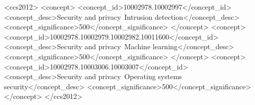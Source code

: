 \begin{CCSXML}
<ccs2012>
   <concept>
       <concept_id>10002978.10002997</concept_id>
       <concept_desc>Security and privacy~Intrusion detection</concept_desc>
       <concept_significance>500</concept_significance>
       </concept>
   <concept>
       <concept_id>10002978.10002979.10002982.10011600</concept_id>
       <concept_desc>Security and privacy~Machine learning</concept_desc>
       <concept_significance>500</concept_significance>
       </concept>
   <concept>
       <concept_id>10002978.10003006.10003007</concept_id>
       <concept_desc>Security and privacy~Operating systems security</concept_desc>
       <concept_significance>500</concept_significance>
       </concept>
 </ccs2012>
\end{CCSXML}

